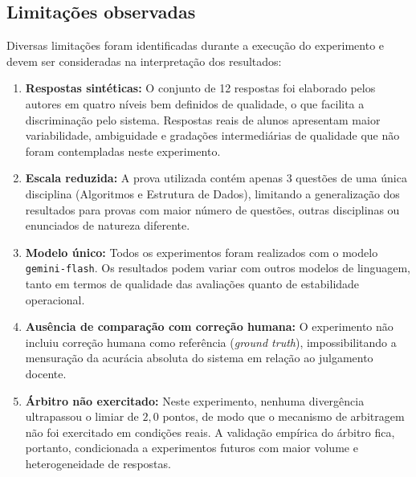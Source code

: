 \subsection{Limitações observadas}

Diversas limitações foram identificadas durante a execução do experimento e devem ser consideradas na interpretação dos resultados:

\begin{enumerate}
    \item \textbf{Respostas sintéticas:} O conjunto de 12 respostas foi elaborado pelos autores em quatro níveis bem definidos de qualidade, o que facilita a discriminação pelo sistema. Respostas reais de alunos apresentam maior variabilidade, ambiguidade e gradações intermediárias de qualidade que não foram contempladas neste experimento.

    \item \textbf{Escala reduzida:} A prova utilizada contém apenas 3 questões de uma única disciplina (Algoritmos e Estrutura de Dados), limitando a generalização dos resultados para provas com maior número de questões, outras disciplinas ou enunciados de natureza diferente.

    \item \textbf{Modelo único:} Todos os experimentos foram realizados com o modelo \texttt{gemini\allowbreak-flash}. Os resultados podem variar com outros modelos de linguagem, tanto em termos de qualidade das avaliações quanto de estabilidade operacional.

    \item \textbf{Ausência de comparação com correção humana:} O experimento não incluiu correção humana como referência (\textit{ground truth}), impossibilitando a mensuração da acurácia absoluta do sistema em relação ao julgamento docente.

    \item \textbf{Árbitro não exercitado:} Neste experimento, nenhuma divergência ultrapassou o limiar de $2{,}0$ pontos, de modo que o mecanismo de arbitragem não foi exercitado em condições reais. A validação empírica do árbitro fica, portanto, condicionada a experimentos futuros com maior volume e heterogeneidade de respostas.
\end{enumerate}
